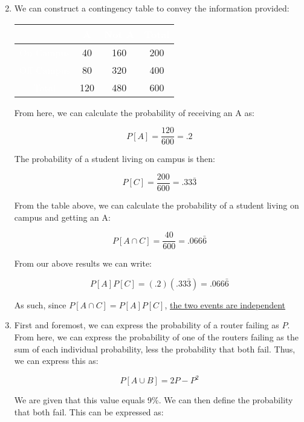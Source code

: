 \begin{enumerate}

    \setcounter{enumi}{1}

  \item We can construct a contingency table to convey the information provided:

    \begin{center}
      \begin{tabular}[H]{|c|c|c|c|}
        \hline
        \rowcolor{black!60} \cellcolor{white} & \textcolor{white}{A} & \textcolor{white}{Not A} & \textcolor{white}{Total}\\
        \hline
        \cellcolor{black!60} \textcolor{white}{On Campus} & 40 & 160 & 200\\
        \hline
        \cellcolor{black!60} \textcolor{white}{Off Campus} & 80 & 320 & 400\\
        \hline
        \cellcolor{black!60} \textcolor{white}{Total} & 120 & 480 & 600\\
        \hline
      \end{tabular}
    \end{center}

    From here, we can calculate the probability of receiving an A as:

    $$P[A]=\frac{120}{600}=.2$$

    The probability of a student living on campus is then:

    $$P[C]=\frac{200}{600}=.33\bar{3}$$

    From the table above, we can calculate the probability of a student living on campus and getting an A:

    $$P[A\cap C]=\frac{40}{600}=.066\bar{6}$$

    From our above results we can write:

    $$P[A]P[C]=(.2)(.33\bar{3})=.066\bar{6}$$

    As such, since $P[A\cap C]=P[A]P[C]$, \underline{the two events are independent}

  \item First and foremost, we can express the probability of a router failing as $P$. From here, we can express the probability of one of the routers failing as the sum of each individual probability, less the probability that both fail. Thus, we can express this as:

    $$P[A\cup B]=2P-P^2$$

    We are given that this value equals 9\%. We can then define the probability that both fail. This can be expressed as:


\end{enumerate}

